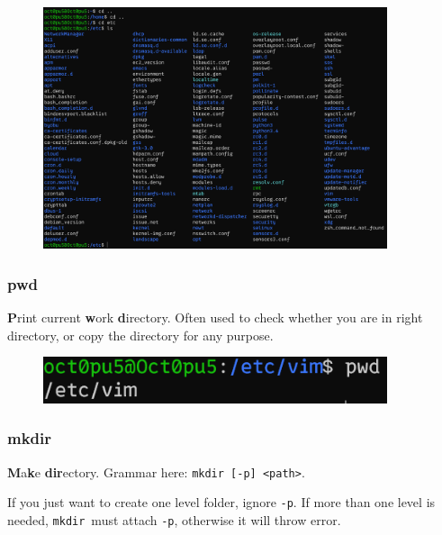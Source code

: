 \documentclass[12pt]{ctexart}
\begin{document}
\begin{figure}[H]
    \centering
    \includegraphics[width=0.9\textwidth,keepaspectratio]{assets/Linux/1.4 Linux directory structure and command/4.png}
\end{figure}

\subsubsection*{\textbf{pwd}}

\textbf{P}rint current \textbf{w}ork \textbf{d}irectory. Often used to
check whether you are in right directory, or copy the directory for any
purpose.

\begin{figure}[H]
    \centering
    \includegraphics[width=0.9\textwidth,keepaspectratio]{assets/Linux/1.4 Linux directory structure and command/5.png}
\end{figure}

\subsubsection*{\textbf{mkdir}}

\textbf{M}a\textbf{k}e \textbf{dir}ectory. Grammar here:
\texttt{mkdir\ {[}-p{]}\ \textless{}path\textgreater{}}.

If you just want to create one level folder, ignore \texttt{-p}. If more
than one level is needed, \texttt{mkdir}\ must attach \texttt{-p},
otherwise it will throw error.
\end{document}
